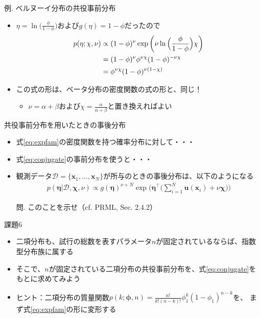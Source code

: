\documentclass[aspectratio=169,unicode,dvipdfmx,14pt]{beamer}
\begin{document}
\begin{frame}{例. ベルヌーイ分布の共役事前分布}
\begin{itemize}
\item $\eta = \ln \Big( \frac{\phi}{1 - \phi} \Big)$および$g(\eta) = 1 - \phi$だったので
\begin{align}
p(\eta; \chi,\nu) & \propto (1 - \phi)^\nu \exp \bigg(\nu \ln \Big( \frac{\phi}{1 - \phi} \Big) \chi \bigg)
\notag \\ & = (1 - \phi)^\nu \phi^{\nu\chi} (1 - \phi)^{ - \nu\chi}
\notag \\ & = \phi^{\nu\chi} (1 - \phi)^{\nu(1 - \chi)}
\end{align}
\item この式の形は、ベータ分布の密度関数の式の形と、同じ！
\begin{itemize}
\item $\nu = \alpha + \beta$および$\chi = \frac{\alpha}{\alpha + \beta}$と置き換えればよい
\end{itemize}
\end{itemize}
\end{frame}

\begin{frame}{共役事前分布を用いたときの事後分布}
\begin{itemize}
\item 式\eqref{eq:expfam}の密度関数を持つ確率分布に対して・・・
\item 式\eqref{eq:conjugate}の事前分布を使うと・・・
\item 観測データ$\mathcal{D} = \{ \bm{x}_1, \ldots, \bm{x}_N \}$が所与のときの事後分布は、以下のようになる
\begin{align}
p(\bm{\eta}|\mathcal{D},\bm{\chi},\nu) \propto g(\bm{\eta})^{\nu + N}
\exp\bigg( \bm{\eta}^\intercal \bigg( \sum_{i=1}^N \bm{u}(\bm{x}_i) + \nu\bm{\chi} \bigg) \bigg)
\end{align}
\item[問.] このことを示せ（cf. PRML, Sec. 2.4.2）
\end{itemize}
\end{frame}


\begin{frame}{課題6}
\begin{itemize}
\item 二項分布も、試行の総数を表すパラメータ$n$が固定されているならば、指数型分布族に属する
\item そこで、$n$が固定されている二項分布の共役事前分布を、式\eqref{eq:conjugate}をもとに求めてみよう
\item ヒント：二項分布の質量関数$p(k;\bm{\phi},n)=\frac{n!}{k!(n-k)!}\phi_1^k(1-\phi_1)^{n-k}$を、
まず式\eqref{eq:expfam}の形に変形する
\end{itemize}
\end{frame}
\end{document}

